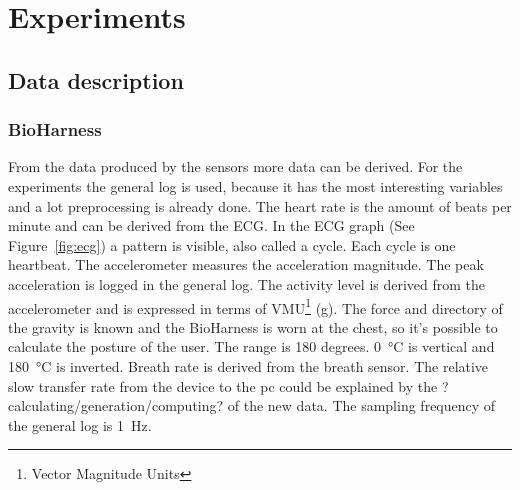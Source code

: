 \section{Experiments}
	\subsection{Data description}
		\subsubsection{BioHarness}
		From the data produced by the sensors more data can be derived. For the experiments the general log is used, because it has the most interesting variables and a lot preprocessing is already done. The heart rate is the amount of beats per minute and can be derived from the ECG. In the ECG graph (See Figure~\ref{fig:ecg}) a pattern is visible, also called a cycle. Each cycle is one heartbeat. 
			The accelerometer measures the acceleration magnitude. The peak acceleration is logged in the general log.
			The activity level is derived from the accelerometer and is expressed in terms of VMU\footnote{Vector Magnitude Units} (g).
			The force and directory of the gravity is known and the BioHarness is worn at the chest, so it's possible to calculate the posture of the user. The range is 180 degrees. \SI{0}{\celsius} is vertical and \SI{180}{\celsius} is inverted.
			Breath rate is derived from the breath sensor. The relative slow transfer rate from the device to the pc could be explained by the ?calculating/generation/computing? of the new data. The sampling frequency of the general log is \SI{1}{\hertz}.
